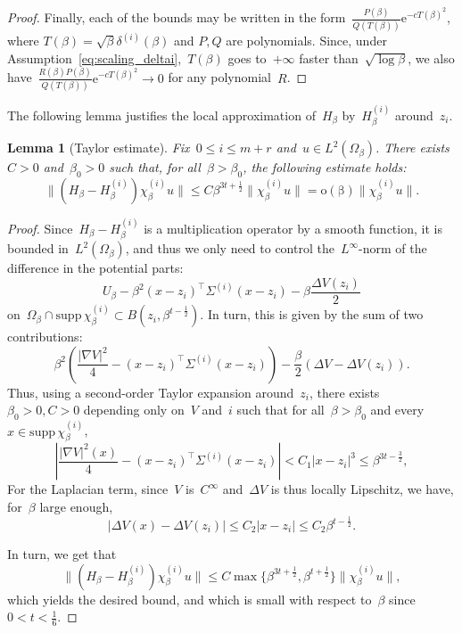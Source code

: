 \documentclass[10pt]{article}
\newcommand{\e}{\mathrm{e}}
\newcommand{\1}{\mathbbm 1}
\newcommand{\scalingExp}{t}
\newtheorem{lemma}{Lemma}
\begin{document}
\begin{proof}
        Finally, each of the bounds may be written in the form~$\frac{P(\beta)}{Q(T(\beta))}\e^{-cT(\beta)^2}$, where $T(\beta) = \sqrt\beta \delta^{(i)}(\beta)$ and $P,Q$ are polynomials. Since, under Assumption~\eqref{eq:scaling_deltai},~$T(\beta)$ goes to~$+\infty$ faster than~$\sqrt{\log\beta}$, we also have~$\frac{R(\beta)P(\beta)}{Q(T(\beta))}\e^{-cT(\beta)^2}\to 0$ for any polynomial~$R$.
    \end{proof}

    The following lemma justifies the local approximation of~$H_\beta$ by~$H_\beta^{(i)}$ around~$z_i$.
    \begin{lemma}[Taylor estimate]
        \label{lemma:taylor_bound}
        Fix~$0\leq i \leq m+r$ and~$u\in L^2(\Omega_\beta)$.
        There exists~$C>0$ and~$\beta_0>0$ such that, for all~$\beta>\beta_0$, the following estimate holds:
        \begin{equation}
            \label{eq:taylor_bound_witten}
            \|(H_\beta-H_\beta^{(i)})\chi_\beta^{(i)} u\| \leq C\beta^{3\scalingExp+\frac12}\|\chi_\beta^{(i)}u\| = \mathrm{o(\beta)}\|\chi_\beta^{(i)}u\|.
        \end{equation}
    \end{lemma}
    \begin{proof}
        Since~$H_\beta-H_\beta^{(i)}$ is a multiplication operator by a smooth function, it is bounded in~$L^2(\Omega_\beta)$, and thus we only need to control the~$L^\infty$-norm of the difference in the potential parts:
       ~$$U_\beta - \beta^2(x-z_i)^\intercal \Sigma^{(i)}(x-z_i) - \beta \frac{\Delta V(z_i)}2$$ on~$\Omega_\beta \cap\mathrm{supp}\,\chi_\beta^{(i)} \subset B(z_i,\beta^{\scalingExp-\frac12})$.
        In turn, this is given by the sum of two contributions:
       ~$$ \beta^2\left(\frac{|\nabla V|^2}4 - (x-z_i)^\intercal \Sigma^{(i)}(x-z_i) \right) - \frac\beta2(\Delta V - \Delta V(z_i)).$$
        Thus, using a second-order Taylor expansion around~$z_i$, there exists~$\beta_0>0, C>0$ depending only on~$V$ and~$i$ such that for all~$\beta>\beta_0$ and every~$x\in \mathrm{supp}\,\chi_\beta^{(i)}$, 
       ~$$\left|\frac{|\nabla V|^2(x)}4 - (x-z_i)^\intercal \Sigma^{(i)}(x-z_i)\right| < C_1 |x-z_i|^3 \leq \beta^{3\scalingExp-\frac32},$$
        For the Laplacian term, since~$V$ is~$C^\infty$ and~$\Delta V$ is thus locally Lipschitz, we have, for~$\beta$ large enough,
       ~$$ \left| \Delta V(x) - \Delta V(z_i)\right| \leq C_2|x-z_i|\leq C_2 \beta^{\scalingExp-\frac12}.$$

        In turn, we get that 
       ~$$\|(H_\beta-H_\beta^{(i)})\chi_\beta^{(i)} u\| \leq C\max\{\beta^{3\scalingExp+\frac12},\beta^{\scalingExp+\frac12}\}\|\chi_\beta^{(i)}u\|,$$
        which yields the desired bound, and which is small with respect to~$\beta$ since~$0<\scalingExp<\frac16$.
    \end{proof}
\end{document}
